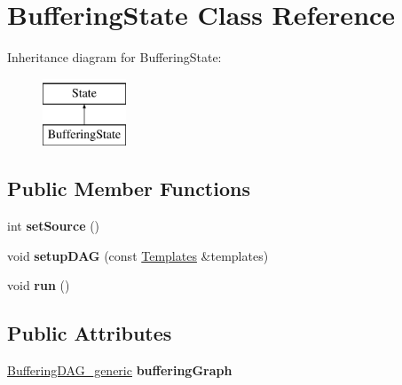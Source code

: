 \hypertarget{classBufferingState}{\section{Buffering\-State Class Reference}
\label{classBufferingState}
}
Inheritance diagram for Buffering\-State\-:\begin{figure}[H]
\begin{center}
\leavevmode
\includegraphics[height=2.000000cm]{classBufferingState}
\end{center}
\end{figure}
\subsection*{Public Member Functions}
\begin{DoxyCompactItemize}
\item 
\hypertarget{classBufferingState_ad1b7c7709fd08d1a036de0671ced7905}{int {\bfseries set\-Source} ()}\label{classBufferingState_ad1b7c7709fd08d1a036de0671ced7905}

\item 
\hypertarget{classBufferingState_ac17a03512a9faf5f72c85d3a62c18b48}{void {\bfseries setup\-D\-A\-G} (const \hyperlink{structTemplates}{Templates} \&templates)}\label{classBufferingState_ac17a03512a9faf5f72c85d3a62c18b48}

\item 
\hypertarget{classBufferingState_aebc85270708bf8801e76be66c92ea797}{void {\bfseries run} ()}\label{classBufferingState_aebc85270708bf8801e76be66c92ea797}

\end{DoxyCompactItemize}
\subsection*{Public Attributes}
\begin{DoxyCompactItemize}
\item 
\hypertarget{classBufferingState_a82786bc89a2076e2d451c0a94aacb2fb}{\hyperlink{classBufferingDAG__generic}{Buffering\-D\-A\-G\-\_\-generic} {\bfseries buffering\-Graph}}\label{classBufferingState_a82786bc89a2076e2d451c0a94aacb2fb}

\end{DoxyCompactItemize}
